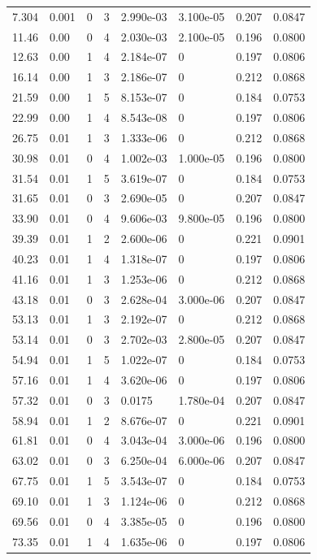 \documentclass[preview]{standalone}
\begin{document}
{{\begin{tabular}{L{1.2cm}C{1.2cm} C{0.3cm}C{0.5cm} C{1.4cm}C{1.4cm} C{1.4cm}C{1.4cm}}
  7.304  &  0.001  & 0     &  3 &  2.990e-03  & 3.100e-05  & 0.207 &  0.0847   \\ 
  11.46  &  0.00  & 0     &  4 &  2.030e-03  & 2.100e-05  & 0.196 &  0.0800   \\ 
  12.63  &  0.00  & 1     &  4 &  2.184e-07  & 0  & 0.197 &  0.0806   \\ 
  16.14  &  0.00  & 1     &  3 &  2.186e-07  & 0  & 0.212 &  0.0868   \\ 
  21.59  &  0.00  & 1     &  5 &  8.153e-07  & 0  & 0.184 &  0.0753   \\ 
  22.99  &  0.00  & 1     &  4 &  8.543e-08  & 0  & 0.197 &  0.0806   \\ 
  26.75  &  0.01  & 1     &  3 &  1.333e-06  & 0  & 0.212 &  0.0868   \\ 
  30.98  &  0.01  & 0     &  4 &  1.002e-03  & 1.000e-05  & 0.196 &  0.0800   \\ 
  31.54  &  0.01  & 1     &  5 &  3.619e-07  & 0  & 0.184 &  0.0753   \\ 
  31.65  &  0.01  & 0     &  3 &  2.690e-05  & 0  & 0.207 &  0.0847   \\ 
  33.90  &  0.01  & 0     &  4 &  9.606e-03  & 9.800e-05  & 0.196 &  0.0800   \\ 
  39.39  &  0.01  & 1     &  2 &  2.600e-06  & 0  & 0.221 &  0.0901   \\ 
  40.23  &  0.01  & 1     &  4 &  1.318e-07  & 0  & 0.197 &  0.0806   \\ 
  41.16  &  0.01  & 1     &  3 &  1.253e-06  & 0  & 0.212 &  0.0868   \\ 
  43.18  &  0.01  & 0     &  3 &  2.628e-04  & 3.000e-06  & 0.207 &  0.0847   \\ 
  53.13  &  0.01  & 1     &  3 &  2.192e-07  & 0  & 0.212 &  0.0868   \\ 
  53.14  &  0.01  & 0     &  3 &  2.702e-03  & 2.800e-05  & 0.207 &  0.0847   \\ 
  54.94  &  0.01  & 1     &  5 &  1.022e-07  & 0  & 0.184 &  0.0753   \\ 
  57.16  &  0.01  & 1     &  4 &  3.620e-06  & 0  & 0.197 &  0.0806   \\ 
  57.32  &  0.01  & 0     &  3 &  0.0175  & 1.780e-04  & 0.207 &  0.0847   \\ 
  58.94  &  0.01  & 1     &  2 &  8.676e-07  & 0  & 0.221 &  0.0901   \\ 
  61.81  &  0.01  & 0     &  4 &  3.043e-04  & 3.000e-06  & 0.196 &  0.0800   \\ 
  63.02  &  0.01  & 0     &  3 &  6.250e-04  & 6.000e-06  & 0.207 &  0.0847   \\ 
  67.75  &  0.01  & 1     &  5 &  3.543e-07  & 0  & 0.184 &  0.0753   \\ 
  69.10  &  0.01  & 1     &  3 &  1.124e-06  & 0  & 0.212 &  0.0868   \\ 
  69.56  &  0.01  & 0     &  4 &  3.385e-05  & 0  & 0.196 &  0.0800   \\ 
  73.35  &  0.01  & 1     &  4 &  1.635e-06  & 0  & 0.197 &  0.0806   \\ 
\hline 
\end{tabular} 

}}
\end{document}
